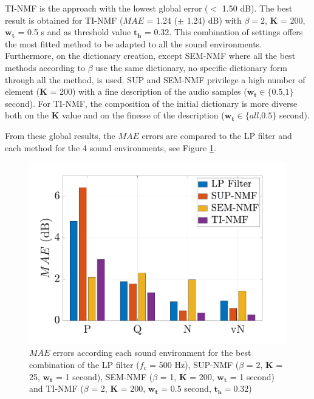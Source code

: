 \documentclass[review,5p,twocolumn,sort&compress,times]{elsarticle}
\begin{document}
TI-NMF is the approach with the lowest global error ($<$ 1.50 dB). The best result is obtained for TI-NMF ($MAE$ = 1.24 ($\pm$ 1.24) dB) with $\beta = 2$, $\mathbf{K}$ = 200, $\mathbf{w_t}$ = 0.5 s and as threshold value $\mathbf{t_h}$ = 0.32. This combination of settings offers the most fitted method to be adapted to all the sound environments. 
Furthermore, on the dictionary creation, except SEM-NMF where all the best methods according to $\beta$ use the same dictionary, no specific dictionary form through all the method, is used. SUP and SEM-NMF privilege a high number of element ($\mathbf{K}$ = 200) with a fine description of the audio samples ($\mathbf{w_t} \in \lbrace 0.5$,$1 \rbrace$ second). For TI-NMF, the composition of the initial dictionary is more diverse both on the $\mathbf{K}$ value and on the finesse  of the description ($\mathbf{w_t} \in \lbrace all$,$0.5 \rbrace$ second). 

From these global results, the $MAE$ errors are compared to the LP filter and each method for the 4 sound environments, see Figure \ref{fig:mae_env}. 

\begin{figure}[t]
\centering
\includegraphics[width=\linewidth]{figures/mea_grafic_bar.pdf}
\caption{$MAE$ errors according each sound environment for the best combination of the LP filter ($f_c$ = 500 Hz), SUP-NMF ($\beta$ = 2, $\mathbf{K}$ = 25, $\mathbf{w_t}$ = 1 second), SEM-NMF ($\beta$ = 1, $\mathbf{K}$ = 200, $\mathbf{w_t}$ = 1 second) and TI-NMF ($\beta$ = 2, $\mathbf{K}$ = 200, $\mathbf{w_t}$ = 0.5 second, $\mathbf{t_{h}} = 0.32$)}
\label{fig:mae_env}
\end{figure}
\end{document}
